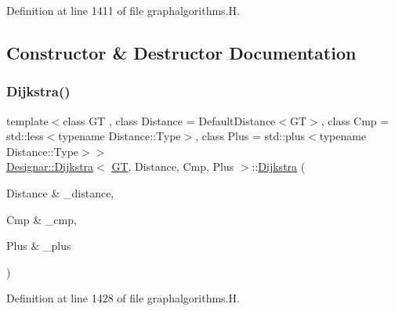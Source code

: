 Definition at line 1411 of file graphalgorithms.\+H.



\subsection{Constructor \& Destructor Documentation}
\mbox{\label{class_designar_1_1_dijkstra_ada4a9a8403304341114425e296c5ed26}} 
\subsubsection{\texorpdfstring{Dijkstra()}{Dijkstra()}\hspace{0.1cm}{\footnotesize\ttfamily [1/2]}}
{\footnotesize\ttfamily template$<$class GT , class Distance  = Default\+Distance$<$\+G\+T$>$, class Cmp  = std\+::less$<$typename Distance\+::\+Type$>$, class Plus  = std\+::plus$<$typename Distance\+::\+Type$>$$>$ \\
\hyperlink{class_designar_1_1_dijkstra}{Designar\+::\+Dijkstra}$<$ \hyperlink{demo-buildgraph_8_c_a3001c40d2c31ca87ed96cd7d1334a55e}{GT}, Distance, Cmp, Plus $>$\+::\hyperlink{class_designar_1_1_dijkstra}{Dijkstra} (\begin{DoxyParamCaption}\item[{Distance \&}]{\+\_\+distance,  }\item[{Cmp \&}]{\+\_\+cmp,  }\item[{Plus \&}]{\+\_\+plus }\end{DoxyParamCaption})\hspace{0.3cm}{\ttfamily [inline]}}



Definition at line 1428 of file graphalgorithms.\+H.

\mbox{\label{class_designar_1_1_dijkstra_a26f374b129c8108d6b95fc57f8dc09df}} 
